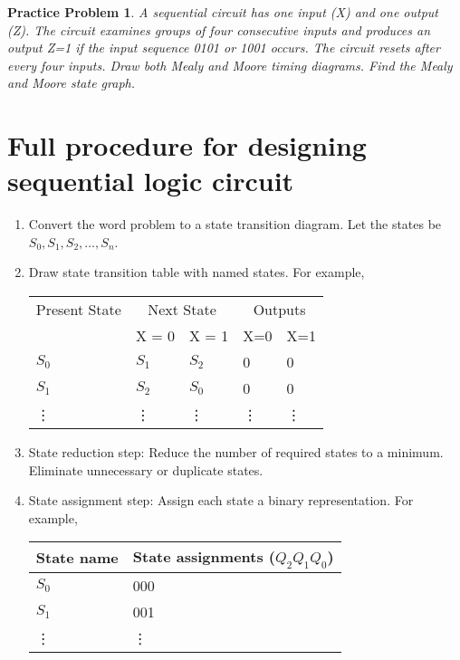 \documentclass{article}
\newtheorem{prob}{Practice Problem}
\begin{document}
\begin{prob}
  A sequential circuit has one input (X) and one output (Z). The circuit
  examines groups of four consecutive inputs and produces an output Z=1 if the
  input sequence 0101 or 1001 occurs. The circuit resets after every four
  inputs. Draw both Mealy and Moore timing diagrams. Find the Mealy and Moore state graph.
\end{prob}
\vspace{20em}

\section{Full procedure for designing sequential logic circuit}

\begin{enumerate}
  \item Convert the word problem to a state transition diagram. Let the states
    be $S_0, S_1, S_2, \dots, S_n$.
  \item Draw state transition table with named states. For example,\\
    \begin{tabular}{lllll}
      \toprule
      Present State & \multicolumn{2}{c}{Next State} & \multicolumn{2}{c}{Outputs} \\
      &  X = 0 & X = 1& X=0 & X=1  \\
      \midrule
       $S_0$ & $S_1$ & $S_2$ & 0 & 0\\
      $S_1$ & $S_2$ & $S_0$ & 0 & 0\\
      \vdots & \vdots & \vdots & \vdots & \vdots  \\
      \bottomrule
    \end{tabular}
   \item State reduction step: Reduce the number of required states to a
     minimum. Eliminate unnecessary or duplicate states.
   \item State assignment step: Assign each state a binary representation. For
     example, \\
     \begin{tabular}{ll}
       \toprule
       State name & State assignments ($Q_2 Q_1 Q_0$)\\
       \midrule
       $S_0$ & 000 \\
       $S_1$ & 001 \\
       \vdots & \vdots\\
       \bottomrule
     \end{tabular}
     

\end{enumerate}
\end{document}
